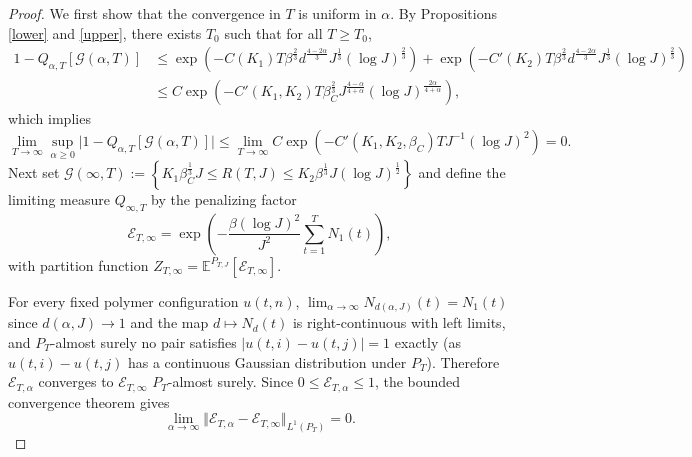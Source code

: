 \documentclass[12pt]{amsart}
\numberwithin{equation}{section}
\newcommand{\1}{\mathbf{1}}
\begin{document}
\begin{proof}
We first show that the convergence in $T$ is uniform in $\alpha$. By Propositions \ref{lower} and \ref{upper}, there exists $T_0$ such that for all $T\ge T_0$,
\begin{equation*}
\begin{split}
    1-Q_{\alpha,T}{[\mathcal{G}(\alpha,T)]}&\leq \exp\left(-C(K_1)T\beta^{\frac{2}{3}}d^{\frac{4-2\alpha}{3}}J^{\frac{1}{3}}(\log J)^{\frac{2}{3}}\right)+\exp\left(-C'(K_2)T\beta^{\frac{2}{3}}d^{\frac{4-2\alpha}{3}}J^{\frac{1}{3}}(\log J)^{\frac{2}{3}}\right)\\
    &\leq C\exp\left(-C'(K_1,K_2)T\beta_C^{\frac{2}{3}}J^{\frac{4-\alpha}{4+\alpha}}(\log J)^{\frac{2\alpha}{4+\alpha}}\right),
\end{split}
\end{equation*}
which implies
\begin{equation*}
    \lim_{T\to\infty}\sup_{\alpha\geq 0}\vert 1-Q_{\alpha,T}{[\mathcal{G}(\alpha,T)]}\vert\leq\lim_{T\to\infty}C\exp\left(-C'(K_1,K_2,\beta_C)TJ^{-1}(\log J)^{2}\right)=0.
\end{equation*}
Next set $\mathcal{G}(\infty,T):=\left\lbrace K_1\beta_C^{\frac{1}{3}}J\leq R(T,J)\leq K_2\beta^{\frac{1}{3}}J(\log J)^{\frac{1}{2}}\right\rbrace$ and define the limiting measure $Q_{\infty,T}$ by the penalizing factor 
\begin{equation*}
    \mathcal{E}_{T,\infty}=\exp\left(-\frac{\beta(\log J)^2}{J^2}\sum_{t=1}^TN_1(t)\right),
\end{equation*}
with partition function $Z_{T,\infty}=\mathbb{E}^{P_{T,J}}[\mathcal{E}_{T,\infty}]$. 

For every fixed polymer configuration $u(t,n)$, $\lim_{\alpha\to\infty}N_{d(\alpha,J)}(t)=N_1(t)$ since $d(\alpha,J)\to 1$ and the map $d \mapsto N_d(t)$ is right-continuous with left limits, and $P_T$-almost surely no pair satisfies $|u(t,i)-u(t,j)| = 1$ exactly (as $u(t,i)-u(t,j)$ has a continuous Gaussian distribution under $P_T$). Therefore $\mathcal{E}_{T,\alpha}$ converges to $\mathcal{E}_{T,\infty}$ $P_T$-almost surely. Since $0\le \mathcal{E}_{T,\alpha}\le 1$, the bounded convergence theorem gives
\begin{equation*}
    \lim_{\alpha\to\infty}\Vert \mathcal{E}_{T,\alpha}-\mathcal{E}_{T,\infty}\Vert_{L^1(P_T)} =0 .
\end{equation*}


\end{proof}
\end{document}
